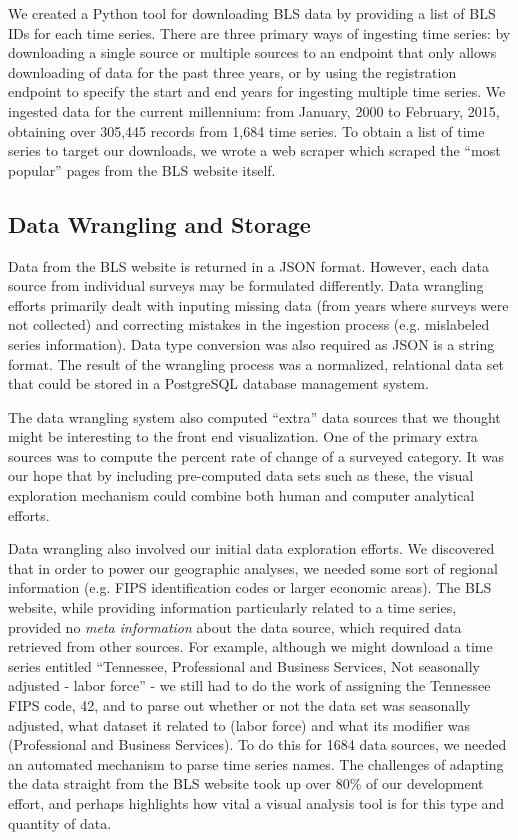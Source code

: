 \documentclass[11pt,letterpaper]{article}
\begin{document}
We created a Python tool for downloading BLS data by providing a list of BLS IDs for each time series. There are three primary ways of ingesting time series: by downloading a single source or multiple sources to an endpoint that only allows downloading of data for the past three years, or by using the registration endpoint to specify the start and end years for ingesting multiple time series. We ingested data for the current millennium: from January, 2000 to February, 2015, obtaining over 305,445 records from 1,684 time series. To obtain a list of time series to target our downloads, we wrote a web scraper which scraped the ``most popular'' pages from the BLS website itself.

\subsection{Data Wrangling and Storage}

Data from the BLS website is returned in a JSON format. However, each data source from individual surveys may be formulated differently. Data wrangling efforts primarily dealt with inputing missing data (from years where surveys were not collected) and correcting mistakes in the ingestion process (e.g. mislabeled series information). Data type conversion was also required as JSON is a string format. The result of the wrangling process was a normalized, relational data set that could be stored in a PostgreSQL database management system.

The data wrangling system also computed ``extra'' data sources that we thought might be interesting to the front end visualization. One of the primary extra sources was to compute the percent rate of change of a surveyed category. It was our hope that by including pre-computed data sets such as these, the visual exploration mechanism could combine both human and computer analytical efforts.

Data wrangling also involved our initial data exploration efforts. We discovered that in order to power our geographic analyses, we needed some sort of regional information (e.g. FIPS identification codes or larger economic areas). The BLS website, while providing information particularly related to a time series, provided no \textit{meta information} about the data source, which required data retrieved from other sources. For example, although we might download a time series entitled ``Tennessee, Professional and Business Services, Not seasonally adjusted - labor force'' - we still had to do the work of assigning the Tennessee FIPS code, 42, and to parse out whether or not the data set was seasonally adjusted, what dataset it related to (labor force) and what its modifier was (Professional and Business Services). To do this for 1684 data sources, we needed an automated mechanism to parse time series names. The challenges of adapting the data straight from the BLS website took up over 80\% of our development effort, and perhaps highlights how vital a visual analysis tool is for this type and quantity of data.
\end{document}
